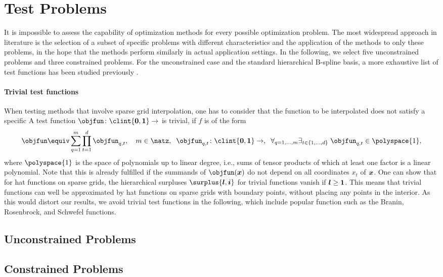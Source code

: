 \section{Test Problems}
\label{sec:52testProblems}

It is impossible to assess the capability of optimization methods
for every possible optimization problem.
The most widespread approach in literature
is the selection of a subset of specific problems
with different characteristics  and
the application of the methods to only these problems,
in the hope that the methods perform similarly in
actual application settings.
In the following, we select five unconstrained problems
and three constrained problems.
For the unconstrained case and the standard hierarchical
B-spline basis, a more exhaustive list of test functions has been
studied previously \cite{Valentin14Hierarchische}.

\paragraph{Trivial test functions}

When testing methods that involve sparse grid interpolation,
one has to consider that the function to be interpolated
does not satisfy a specific 
A test function $\objfun\colon \clint{\*0, \*1} \to \real$ is trivial, if
$f$ is of the form
\begin{equation}
  \objfun \equiv \sum_{q=1}^m \prod_{t=1}^d \objfun_{q,t},\quad
  m \in \natz,\;\;
  \objfun_{q,t}\colon \clint{\*0, \*1} \to \real,\;\;
  \faex{q = 1, \dotsc, m}{t \in \{1, \dotsc, d\}}{
    \objfun_{q,t} \in \polyspace{1},
  }
\end{equation}
where $\polyspace{1}$ is the space of polynomials up to linear degree,
i.e., sums of tensor products of which at least one factor is a
linear polynomial.
Note that this is already fulfilled if the summands of $\objfun(\*x)$
do not depend on all coordinates $x_t$ of ${\boldsymbol{x}}$.
One can show that for hat functions on sparse grids,
the hierarchical surpluses $\surplus{\*l,\*i}$ for trivial functions
vanish if ${\boldsymbol{l}} \ge {\boldsymbol{1}}$.
This means that trivial functions can well be approximated by hat functions
on sparse grids with boundary points, without placing any points
in the interior.
As this would distort our results,
we avoid trivial test functions in the following,
which include popular function such as the
Branin, Rosenbrock, and Schwefel functions.

\subsection{Unconstrained Problems}
\label{sec:511unconstrainedProblems}

\blindtext{}

\subsection{Constrained Problems}
\label{sec:512constrainedProblems}

\blindtext{}
